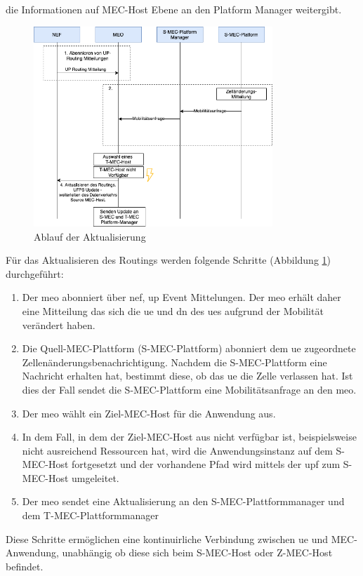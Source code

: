 \documentclass[runningheads]{llncs}
\numberwithin{figure}{section}
\begin{document}
die Informationen auf MEC-Host Ebene an den Platform Manager weitergibt. \cite{etsiMultiaccessEdgeComputinga}  \cite{balasubramanianMobilityManagementArchitecture2019}
\begin{figure}
  \centering
  \includegraphics[width=9cm]{images/Datenverkehr_Ablauf.png}
  \caption{Ablauf der Aktualisierung}
  \label{fig:Datenverkehr_Ablauf}
\end{figure}
Für das Aktualisieren des Routings werden folgende Schritte (Abbildung \ref{fig:Datenverkehr_Ablauf}) durchgeführt:
\begin{enumerate}
  \item Der \acrfull{meo} abonniert über \acrshort{nef}, \acrshort{up} Event Mittelungen. 
  Der \acrshort{meo} erhält daher eine Mitteilung das sich die \acrshort{ue} und \acrshort{dn} des
  \acrshort{ue}s aufgrund der Mobilität verändert haben.
  \item Die Quell-MEC-Plattform (S-MEC-Plattform) abonniert dem \acrshort{ue} zugeordnete Zellenänderungsbenachrichtigung. 
  Nachdem die S-MEC-Plattform eine Nachricht erhalten hat, bestimmt diese, ob das \acrshort{ue} die Zelle verlassen hat. 
  Ist dies der Fall sendet die S-MEC-Plattform eine Mobilitätsanfrage an den \acrshort{meo}.
  \item Der \acrshort{meo} wählt ein Ziel-MEC-Host für die Anwendung aus.
  \item In dem Fall, in dem der Ziel-MEC-Host aus nicht verfügbar ist, beispielsweise nicht ausreichend Ressourcen hat,
  wird die Anwendungsinstanz auf dem S-MEC-Host fortgesetzt und der vorhandene Pfad wird mittels der \acrshort{upf} zum S-MEC-Host umgeleitet.
  \item Der \acrshort{meo} sendet eine Aktualisierung an den S-MEC-Plattformmanager und dem T-MEC-Plattformmanager
\end{enumerate}
Diese Schritte ermöglichen eine kontinuirliche Verbindung zwischen \acrshort{ue} und MEC-Anwendung, unabhängig ob diese sich beim S-MEC-Host oder Z-MEC-Host befindet.
\newpage
\end{document}

